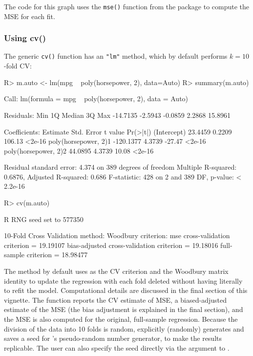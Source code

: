 \documentclass[
]{jss}
\begin{document}
The code for this graph uses the \texttt{mse()} function from the
 package to compute the MSE for each fit.

\hypertarget{using-cv}{%
\subsubsection{Using cv()}\label{using-cv}}

The generic \texttt{cv()} function has an \texttt{"lm"} method, which by
default performs \(k = 10\)-fold CV:

\begin{CodeChunk}
\begin{CodeInput}
R> m.auto <- lm(mpg ~ poly(horsepower, 2), data=Auto)
R> summary(m.auto)
\end{CodeInput}
\begin{CodeOutput}

Call:
lm(formula = mpg ~ poly(horsepower, 2), data = Auto)

Residuals:
     Min       1Q   Median       3Q      Max 
-14.7135  -2.5943  -0.0859   2.2868  15.8961 

Coefficients:
                      Estimate Std. Error t value Pr(>|t|)
(Intercept)            23.4459     0.2209  106.13   <2e-16
poly(horsepower, 2)1 -120.1377     4.3739  -27.47   <2e-16
poly(horsepower, 2)2   44.0895     4.3739   10.08   <2e-16

Residual standard error: 4.374 on 389 degrees of freedom
Multiple R-squared:  0.6876,    Adjusted R-squared:  0.686 
F-statistic:   428 on 2 and 389 DF,  p-value: < 2.2e-16
\end{CodeOutput}
\begin{CodeInput}
R> cv(m.auto)
\end{CodeInput}
\begin{CodeOutput}
R RNG seed set to 577350
\end{CodeOutput}
\begin{CodeOutput}
10-Fold Cross Validation
method: Woodbury
criterion: mse
cross-validation criterion = 19.19107
bias-adjusted cross-validation criterion = 19.18016
full-sample criterion = 18.98477 
\end{CodeOutput}
\end{CodeChunk}

The  method by default uses  as the CV criterion
and the Woodbury matrix identity to update the regression with each fold
deleted without having literally to refit the model. Computational
details are discussed in the final section of this vignette. The
function reports the CV estimate of MSE, a biased-adjusted estimate of
the MSE (the bias adjustment is explained in the final section), and the
MSE is also computed for the original, full-sample regression. Because
the division of the data into 10 folds is random,  explicitly
(randomly) generates and saves a seed for 's pseudo-random
number generator, to make the results replicable. The user can also
specify the seed directly via the  argument to .
\end{document}
